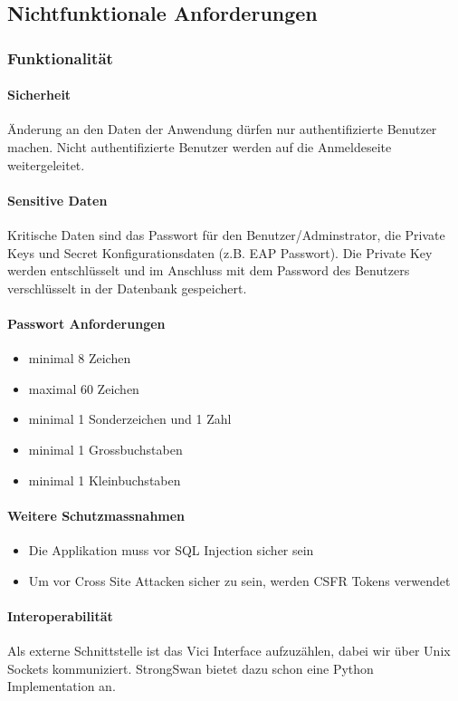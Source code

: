\subsection{Nichtfunktionale Anforderungen}
\subsubsection{Funktionalität}
\paragraph{Sicherheit}
Änderung an den Daten der Anwendung dürfen nur authentifizierte Benutzer machen. Nicht authentifizierte Benutzer werden auf die Anmeldeseite weitergeleitet.

\paragraph{Sensitive Daten}
Kritische Daten sind das Passwort für den Benutzer/Adminstrator, die Private Keys und Secret Konfigurationsdaten (z.B. EAP Passwort). Die Private Key werden entschlüsselt und im Anschluss mit dem Password des Benutzers verschlüsselt in der Datenbank gespeichert.

\paragraph{Passwort Anforderungen}
\begin{itemize}
	\item minimal 8 Zeichen
	\item maximal 60 Zeichen
	\item minimal 1 Sonderzeichen und 1 Zahl
	\item minimal 1 Grossbuchstaben
	\item minimal 1 Kleinbuchstaben
\end{itemize}

\paragraph{Weitere Schutzmassnahmen}
\begin{itemize}
	\item Die Applikation muss vor SQL Injection sicher sein
	\item Um vor Cross Site Attacken sicher zu sein, werden CSFR Tokens verwendet
\end{itemize}

\paragraph{Interoperabilität}
Als externe Schnittstelle ist das Vici Interface aufzuzählen, dabei wir über Unix Sockets kommuniziert. StrongSwan bietet dazu schon eine Python Implementation an.
